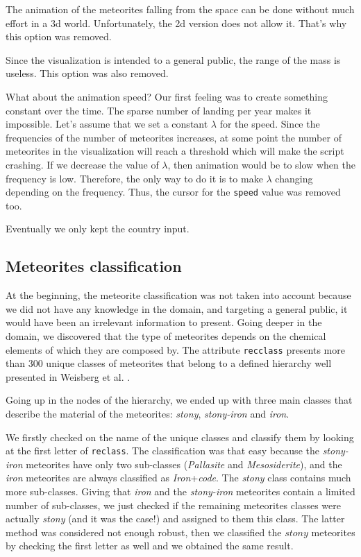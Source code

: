 \documentclass[10pt,conference,compsocconf]{IEEEtran}
\begin{document}
The animation of the meteorites falling from the space can be done without much effort in a 3d world. Unfortunately, the 2d version does not allow it. That's why this option was removed.

Since the visualization is intended to a general public, the range of the mass is useless. This option was also removed.

What about the animation speed? Our first feeling was to create something constant over the time. The sparse number of landing per year makes it impossible. Let's assume that we set a constant $\lambda$ for the speed. Since the frequencies of the number of meteorites increases, at some point the number of meteorites in the visualization will reach a threshold which will make the script crashing. If we decrease the value of $\lambda$, then animation would be to slow when the frequency is low. Therefore, the only way to do it is to make $\lambda$ changing depending on the frequency. Thus, the cursor for the \texttt{speed} value was removed too.

Eventually we only kept the country input.

\subsection{Meteorites classification}

At the beginning, the meteorite classification was not taken into account because we did not have any knowledge in the domain, and targeting a general public, it would have been an irrelevant information to present. Going deeper in the domain, we discovered that the type of meteorites depends on the chemical elements of which they are composed by. The attribute \texttt{recclass} presents more than $300$ unique classes of meteorites that belong to a defined hierarchy well presented in Weisberg et al.  \cite{weisberg_systematics_2006}.

Going up in the nodes of the hierarchy, we ended up with three main classes that describe the material of the meteorites: \textit{stony}, \textit{stony-iron} and \textit{iron}.
 
We firstly checked on the name of the unique classes and classify them by looking at the first letter of \texttt{reclass}. The classification was that easy because the \textit{stony-iron} meteorites have only two sub-classes (\textit{Pallasite} and \textit{Mesosiderite}), and the \textit{iron} meteorites are always classified as \textit{Iron}+\textit{code}. The \textit{stony} class contains much more sub-classes. Giving that \textit{iron} and the \textit{stony-iron} meteorites contain a limited number of sub-classes, we just checked if the remaining meteorites classes were actually \textit{stony} (and it was the case!) and assigned to them this class. The latter method was considered not enough robust, then we classified the $stony$ meteorites by checking the first letter as well and we obtained the same result.
\end{document}
